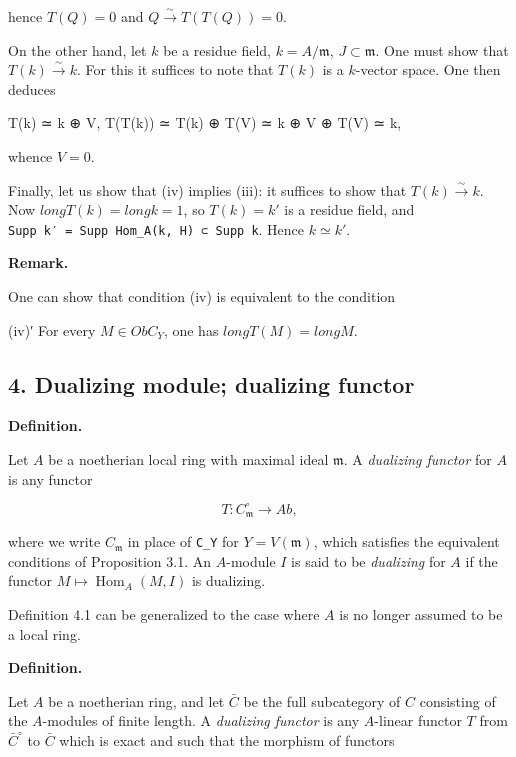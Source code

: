\documentclass[
]{article}
\newenvironment{Shaded}{}{}
\newcommand{\NormalTok}[1]{#1}
\begin{document}
hence \(T(Q) = 0\) and \(Q \xrightarrow{\sim} T(T(Q)) = 0\).

On the other hand, let \(k\) be a residue field, \(k = A/\mathfrak{m}\),
\(J \subset \mathfrak{m}\). One must show that
\(T(k) \xrightarrow{\sim} k\). For this it suffices to note that
\(T(k)\) is a \(k\)-vector space. One then deduces

\begin{Shaded}
\begin{Highlighting}[]
\NormalTok{T(k) ≃ k ⊕ V,}
\NormalTok{T(T(k)) ≃ T(k) ⊕ T(V) ≃ k ⊕ V ⊕ T(V) ≃ k,}
\end{Highlighting}
\end{Shaded}

whence \(V = 0\).

Finally, let us show that (iv) implies (iii): it suffices to show that
\(T(k) \xrightarrow{\sim} k\). Now \(long T(k) = long k = 1\), so
\(T(k) = k'\) is a residue field, and
\texttt{Supp\ k′\ =\ Supp\ Hom\_A(k,\ H)\ ⊂\ Supp\ k}. Hence
\(k \simeq k'\).

\textbf{Remark.}

One can show that condition (iv) is equivalent to the condition

(iv)′ For every \(M \in Ob C_{Y}\), one has \(long T(M) = long M\).

\subsection{4. Dualizing module; dualizing
functor}\label{dualizing-module-dualizing-functor}

\textbf{Definition.}

Let \(A\) be a noetherian local ring with maximal ideal
\(\mathfrak{m}\). A \emph{dualizing functor} for \(A\) is any functor

\[
T : C^{\circ}_{\mathfrak{m}} \longrightarrow Ab,
\]

where we write \(C_{\mathfrak{m}}\) in place of \texttt{C\_Y} for
\(Y = V(\mathfrak{m})\), which satisfies the equivalent conditions of
Proposition 3.1. An \(A\)-module \(I\) is said to be \emph{dualizing}
for \(A\) if the functor \(M \mapsto \operatorname{Hom}_{A}(M, I)\) is
dualizing.

Definition 4.1 can be generalized to the case where \(A\) is no longer
assumed to be a local ring.

\textbf{Definition.}

Let \(A\) be a noetherian ring, and let \(\bar{C}\) be the full
subcategory of \(C\) consisting of the \(A\)-modules of finite length. A
\emph{dualizing functor} is any \(A\)-linear functor \(T\) from
\(\bar{C}^{\circ}\) to \(\bar{C}\) which is exact and such that the
morphism of functors
\end{document}
